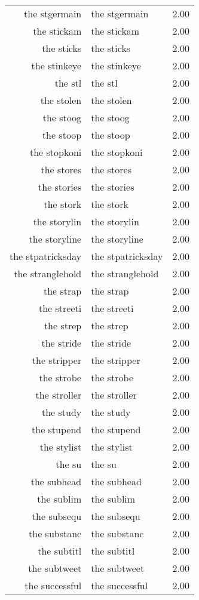 \begin{table}[ht]
\begin{tabular}{rlr}
  the stgermain & the stgermain & 2.00 \\ 
  the stickam & the stickam & 2.00 \\ 
  the sticks & the sticks & 2.00 \\ 
  the stinkeye & the stinkeye & 2.00 \\ 
  the stl & the stl & 2.00 \\ 
  the stolen & the stolen & 2.00 \\ 
  the stoog & the stoog & 2.00 \\ 
  the stoop & the stoop & 2.00 \\ 
  the stopkoni & the stopkoni & 2.00 \\ 
  the stores & the stores & 2.00 \\ 
  the stories & the stories & 2.00 \\ 
  the stork & the stork & 2.00 \\ 
  the storylin & the storylin & 2.00 \\ 
  the storyline & the storyline & 2.00 \\ 
  the stpatricksday & the stpatricksday & 2.00 \\ 
  the stranglehold & the stranglehold & 2.00 \\ 
  the strap & the strap & 2.00 \\ 
  the streeti & the streeti & 2.00 \\ 
  the strep & the strep & 2.00 \\ 
  the stride & the stride & 2.00 \\ 
  the stripper & the stripper & 2.00 \\ 
  the strobe & the strobe & 2.00 \\ 
  the stroller & the stroller & 2.00 \\ 
  the study & the study & 2.00 \\ 
  the stupend & the stupend & 2.00 \\ 
  the stylist & the stylist & 2.00 \\ 
  the su & the su & 2.00 \\ 
  the subhead & the subhead & 2.00 \\ 
  the sublim & the sublim & 2.00 \\ 
  the subsequ & the subsequ & 2.00 \\ 
  the substanc & the substanc & 2.00 \\ 
  the subtitl & the subtitl & 2.00 \\ 
  the subtweet & the subtweet & 2.00 \\ 
  the successful & the successful & 2.00 \\ 

\end{tabular}
\end{table}
